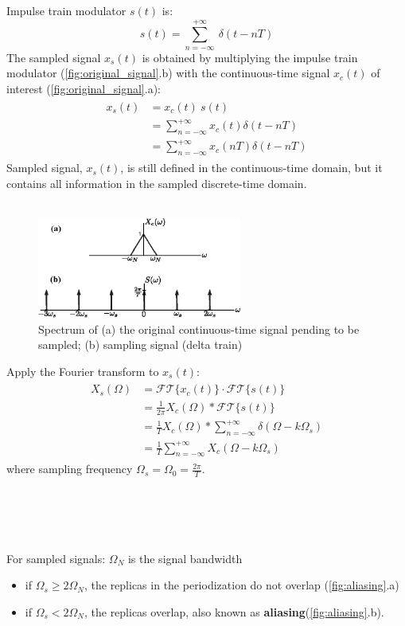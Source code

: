 Impulse train modulator $s(t)$ is: 
\[ 
    s(t) = \sum_{n=-\infty}^{+\infty} \ \delta(t-nT) 
\]
The sampled signal $x_{s}(t)$ is obtained by multiplying the impulse train modulator (\autoref{fig:original_signal}.b) with the continuous-time signal $x_{c}(t)$ of interest (\autoref{fig:original_signal}.a):
\begin{align*} 
\begin{split}
x_{s}(t) &= x_{c}(t) \ s(t)\\
&= \sum_{n=-\infty}^{+\infty} x_{c}(t) \delta(t-nT)\\
&= \sum_{n=-\infty}^{+\infty} x_{c}(nT) \delta(t-nT)
\end{split}
\end{align*}
Sampled signal, $x_{s}(t)$, is still defined in the continuous-time domain, but it contains all information in the sampled discrete-time domain.\\\\

\begin{minipage}{\textwidth}
\begin{figure}
    \includegraphics[width = 0.6\textwidth]{images/sample_signal_delta_train.eps}
    \caption{Spectrum of (a) the original continuous-time signal pending to be sampled; (b) sampling signal (delta train)}
    \label{fig:original_signal}
\end{figure}
Apply the Fourier transform to  $x_{s}(t)$:
\begin{align*} 
\begin{split}
    X_{s}(\Omega) 
    & = \mathcal{FT}\{x_{c}(t)\} \cdot \mathcal{FT}\{s(t)\}\\
    & = \frac{1}{2\pi} X_{c}(\Omega) * \mathcal{FT}\{s(t)\} \\
    & = \frac{1}{T} X_{c}(\Omega) * \sum_{n=-\infty}^{+\infty} \delta (\Omega - k \Omega_{s})\\
    & = \boxed{\frac{1}{T} \sum_{n=-\infty}^{+\infty}  X_{c}(\Omega - k \Omega_{s})}
\end{split} 
\end{align*}
where sampling frequency $\Omega_{s}=\Omega_{0}=\frac{2\pi}{T}$.
\end{minipage}
\ \\\\\\\\
For sampled signals: $\Omega_{N}$ is the signal bandwidth
\begin{itemize}
    \item if $\Omega_{s} \geq 2\Omega_{N}$, the replicas in the periodization do not overlap (\autoref{fig:aliasing}.a)
    \item if $\Omega_{s} < 2\Omega_{N}$, the replicas overlap, also known as \textbf{aliasing}(\autoref{fig:aliasing}.b).
\end{itemize} 

